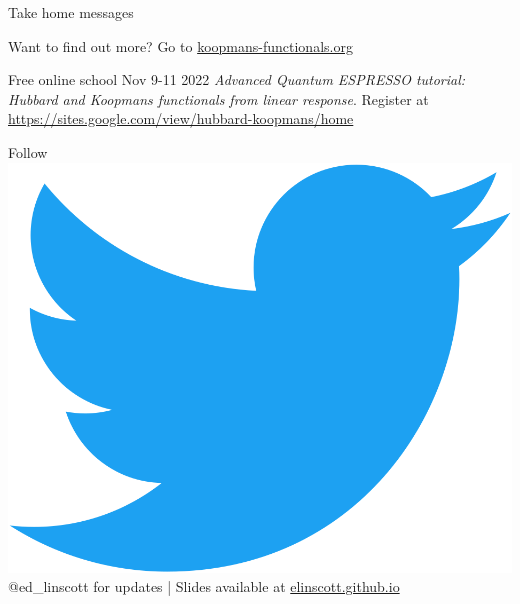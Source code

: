 \documentclass[xcolor=table,aspectratio=169]{beamer}
\numberwithin{equation}{section}
\begin{document}
\begin{frame}{Take home messages}
   \begin{center}
      \scriptsize
      Want to find out more? Go to \url{koopmans-functionals.org}

      Free online school Nov 9-11 2022 \emph{Advanced Quantum ESPRESSO tutorial: Hubbard and Koopmans functionals from linear response}. Register at \url{https://sites.google.com/view/hubbard-koopmans/home}

      Follow \includegraphics[height=\fontcharht\font`\B]{figures/Twitter_Bird.png} \textcolor{twitter_blue}{@ed\_linscott} for updates | Slides available at \url{elinscott.github.io}
   \end{center}

\end{frame}
\end{document}
